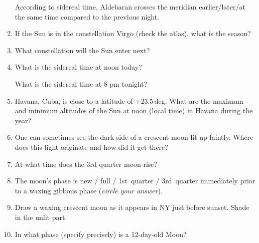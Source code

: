 \documentclass[12pt]{article}
\begin{document}
\begin{enumerate}
According to sidereal time, Aldebaran crosses the meridian
earlier/later/at the same time compared to the previous night.

\item
If the Sun is in the constellation Virgo (check the atlas), what is
the season?

\vspace{0.5in}

\item
What constellation will the Sun enter next?

\vspace{0.5in}

\item
What is the sidereal time at noon today?

\vspace{0.5in}

What is the sidereal time at 8 pm tonight?

\vspace{0.5in}

\item
Havana, Cuba, is close to a latitude of $+23.5$\,deg.  What are the
maximum and minimum altitudes of the Sun at noon (local time) in
Havana during the year?

\vspace{1in}

\item
One can sometimes see the dark side of a crescent moon lit up faintly.
Where does this light originate and how did it get there?

\vspace{1in}

\item
At what time does the 3rd quarter moon rise?

\vspace{0.5in}

\item 
The moon's phase is new / full / 1st~quarter / 3rd~quarter immediately
prior to a waxing gibbous phase (\emph{circle your answer}).

\item
Draw a waxing crescent moon as it appears in NY just before sunset.
Shade in the unlit part.

\vspace{1.5in}

\item 
In what phase (specify precisely) is a 12-day-old Moon?

\vspace{0.5in}


\end{enumerate}
\end{document}
